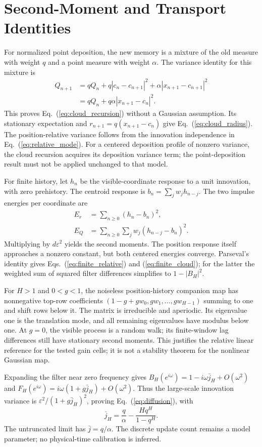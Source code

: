 \appendix
\section{Second-Moment and Transport Identities}
For normalized point deposition, the new memory is a mixture of the old
measure with weight $q$ and a point measure with weight $\alpha$. The
variance identity for this mixture is
\begin{align}
Q_{n+1}&=q Q_n+q|c_n-c_{n+1}|^2
+\alpha|x_{n+1}-c_{n+1}|^2\\
&=qQ_n+q\alpha|x_{n+1}-c_n|^2.
\end{align}
This proves Eq.~(\ref{eq:cloud_recursion}) without a Gaussian assumption.
Its stationary expectation and $r_{n+1}=q(x_{n+1}-c_n)$ give
Eq.~(\ref{eq:cloud_radius}). The position-relative variance follows from
the innovation independence in Eq.~(\ref{eq:relative_mode}). For a centered
deposition profile of nonzero variance, the cloud recursion acquires its
deposition variance term; the point-deposition result must not be applied
unchanged to that model.

For finite history, let $h_n$ be the visible-coordinate response to a unit
innovation, with zero prehistory. The centroid response is
$b_n=\sum_jw_jh_{n-j}$. The two impulse energies per coordinate are
\begin{align}
E_r&=\sum_{n\geq0}(h_n-b_n)^2,\\
E_Q&=\sum_{n\geq0}\sum_jw_j(h_{n-j}-b_n)^2.
\end{align}
Multiplying by $d\varepsilon^2$ yields the second moments. The position
response itself approaches a nonzero constant, but both centered energies
converge. Parseval's identity gives Eqs.~(\ref{eq:finite_relative}) and
(\ref{eq:finite_cloud}); for the latter the weighted sum of squared filter
differences simplifies to $1-|B_H|^2$.

For $H>1$ and $0<g<1$, the noiseless position-history companion map has
nonnegative top-row coefficients $(1-g+gw_0,gw_1,\ldots,gw_{H-1})$ summing
to one and shift rows below it. The matrix is irreducible and aperiodic.
Its eigenvalue one is the translation mode, and all remaining eigenvalues
have modulus below one. At $g=0$, the visible process is a random walk;
its finite-window lag differences still have stationary second moments.
This justifies the relative linear reference for the tested gain cells;
it is not a stability theorem for the nonlinear Gaussian map.

Expanding the filter near zero frequency gives
$B_H(e^{i\omega})=1-i\omega\bar j_H+O(\omega^2)$ and
$F_H(e^{i\omega})=i\omega(1+g\bar j_H)+O(\omega^2)$.
Thus the large-scale innovation variance is
$\varepsilon^2/(1+g\bar j_H)^2$, proving Eq.~(\ref{eq:diffusion}), with
\begin{equation}
\bar j_H=\frac{q}{\alpha}-\frac{Hq^H}{1-q^H}.
\end{equation}
The untruncated limit has $\bar j=q/\alpha$. The discrete update count
remains a model parameter; no physical-time calibration is inferred.

